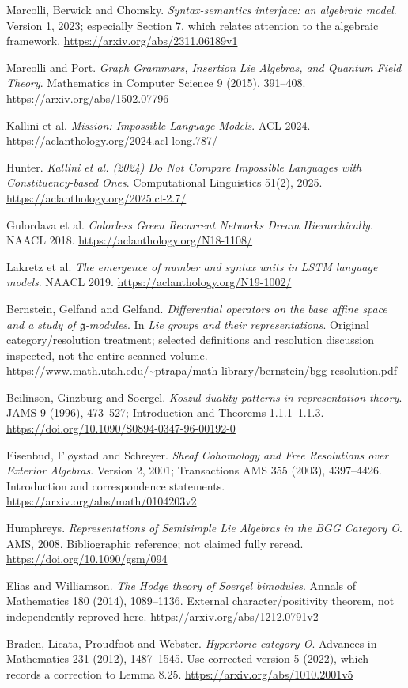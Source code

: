 \begin{description}[style=nextline,leftmargin=1cm]
\item[R17] Marcolli, Berwick and Chomsky. \emph{Syntax-semantics interface: an algebraic model}. Version 1, 2023; especially Section 7, which relates attention to the algebraic framework. \url{https://arxiv.org/abs/2311.06189v1}
\item[R18] Marcolli and Port. \emph{Graph Grammars, Insertion Lie Algebras, and Quantum Field Theory}. Mathematics in Computer Science 9 (2015), 391--408. \url{https://arxiv.org/abs/1502.07796}
\item[R19] Kallini et al. \emph{Mission: Impossible Language Models}. ACL 2024. \url{https://aclanthology.org/2024.acl-long.787/}
\item[R20] Hunter. \emph{Kallini et al. (2024) Do Not Compare Impossible Languages with Constituency-based Ones}. Computational Linguistics 51(2), 2025. \url{https://aclanthology.org/2025.cl-2.7/}
\item[R21] Gulordava et al. \emph{Colorless Green Recurrent Networks Dream Hierarchically}. NAACL 2018. \url{https://aclanthology.org/N18-1108/}
\item[R22] Lakretz et al. \emph{The emergence of number and syntax units in LSTM language models}. NAACL 2019. \url{https://aclanthology.org/N19-1002/}
\item[B1] Bernstein, Gelfand and Gelfand. \emph{Differential operators on the base affine space and a study of $\mathfrak g$-modules}. In \emph{Lie groups and their representations}. Original category/resolution treatment; selected definitions and resolution discussion inspected, not the entire scanned volume. \url{https://www.math.utah.edu/~ptrapa/math-library/bernstein/bgg-resolution.pdf}
\item[B2] Beilinson, Ginzburg and Soergel. \emph{Koszul duality patterns in representation theory}. JAMS 9 (1996), 473--527; Introduction and Theorems 1.1.1--1.1.3. \url{https://doi.org/10.1090/S0894-0347-96-00192-0}
\item[B3] Eisenbud, Fl\o ystad and Schreyer. \emph{Sheaf Cohomology and Free Resolutions over Exterior Algebras}. Version 2, 2001; Transactions AMS 355 (2003), 4397--4426. Introduction and correspondence statements. \url{https://arxiv.org/abs/math/0104203v2}
\item[B4] Humphreys. \emph{Representations of Semisimple Lie Algebras in the BGG Category O}. AMS, 2008. Bibliographic reference; not claimed fully reread. \url{https://doi.org/10.1090/gsm/094}
\item[B5] Elias and Williamson. \emph{The Hodge theory of Soergel bimodules}. Annals of Mathematics 180 (2014), 1089--1136. External character/positivity theorem, not independently reproved here. \url{https://arxiv.org/abs/1212.0791v2}
\item[B6] Braden, Licata, Proudfoot and Webster. \emph{Hypertoric category O}. Advances in Mathematics 231 (2012), 1487--1545. Use corrected version 5 (2022), which records a correction to Lemma 8.25. \url{https://arxiv.org/abs/1010.2001v5}
\end{description}
